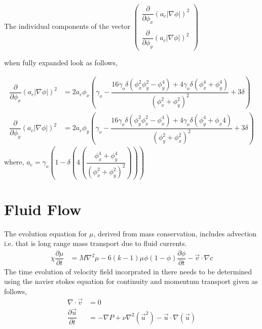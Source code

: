 \documentclass[a4paper]{report}
\begin{document}
\begin{mdframed}[style=MyFrame]
The individual components of the vector 
$\begin{pmatrix}
	\dfrac{\partial}{\partial \phi_x}\left(a_c|\nabla\phi|\right)^2\\
	\\
	\dfrac{\partial}{\partial \phi_y}\left(a_c|\nabla\phi|\right)^2
\end{pmatrix}$

when fully expanded look as follows,

\begin{align}
 \dfrac{\partial}{\partial \phi_x}\left(a_c|\nabla\phi|\right)^2 &= 2a_c\phi_x\left(\gamma_o - \dfrac{16\gamma_o\delta\left(\phi_x^2\phi_y^2 - \phi_y^4\right)+4\gamma_o\delta\left(\phi_x^4+\phi_y^4\right)}
 {\left(\phi_x^2+\phi_y^2\right)^2} + 3\delta\right)\\ 
 \dfrac{\partial}{\partial \phi_y}\left(a_c|\nabla\phi|\right)^2 &= 2a_c\phi_y\left(\gamma_o - \dfrac{16\gamma_o\delta\left(\phi_y^2\phi_x^2 - \phi_x^4\right)+4\gamma_o\delta\left(\phi_y^4+\phi_x4\right)}
 {\left(\phi_y^2+\phi_x^2\right)^2} + 3\delta\right)
\end{align}
where, $ a_c = \gamma_o\left(1 - \delta\left(4\left(\dfrac{\phi_x^4+\phi_y^4}{\left(\phi_x^2+\phi_y^2\right)^2}\right)\right)\right)$
\end{mdframed}

\section{Fluid Flow}
The evolution equation for $\mu$, derived from mass conservation, includes advection i.e. that is long range 
mass transport due to fluid currents.
\begin{align}
\chi \dfrac{\partial \mu}{\partial t} &=  M\nabla^2\mu 
	- 6\left(k-1\right)\mu\phi\left(1-\phi\right)\dfrac{\partial\phi}{\partial t}- \vec{v}\cdot\nabla c
\label{mu_evolution}
\end{align}
The time evolution of velocity field incorprated in there needs to be determined using the 
navier stokes equation for continuity and momentum transport given as follows,
\begin{align}
	\nabla\cdot\vec{v} &= 0\\
	\dfrac{\partial \vec{u}}{\partial t} &= - \nabla P + \nu\nabla^2\left(\vec{u}^2\right) - \vec{u}\cdot\nabla\left(\vec{u}\right)
\end{align}
\end{document}
